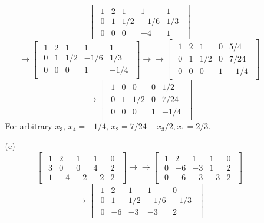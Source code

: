 \documentclass[12pt]{article}
\begin{document}
\begin{itemize}
\begin{itemize}
$$\begin{bmatrix}
\begin{array}{cccc|c}
1 & 2 & 1 & 1 & 1 \\
0 & 1 & 1/2 & -1/6 & 1/3 \\
0 & 0 & 0 & -4 & 1
\end{array}
\end{bmatrix}$$
$$\rightarrow \begin{bmatrix}
\begin{array}{cccc|c}
1 & 2 & 1 & 1 & 1 \\
0 & 1 & 1/2 & -1/6 & 1/3 \\
0 & 0 & 0 & 1 & -1/4
\end{array}
\end{bmatrix}\rightarrow\rightarrow \begin{bmatrix}
\begin{array}{cccc|c}
1 & 2 & 1 & 0 & 5/4 \\
0 & 1 & 1/2 & 0 & 7/24 \\
0 & 0 & 0 & 1 & -1/4
\end{array}
\end{bmatrix}$$
$$\rightarrow \begin{bmatrix}
\begin{array}{cccc|c}
1 & 0 & 0 & 0 & 1/2 \\
0 & 1 & 1/2 & 0 & 7/24 \\
0 & 0 & 0 & 1 & -1/4
\end{array}
\end{bmatrix}$$
For arbitrary $x_3$, $x_4 = -1/4$, $x_2 = 7/24 - x_3/2, x_1 = 2/3$.
\item[(c)]
$$\begin{bmatrix}
\begin{array}{cccc|c}
1 & 2 & 1 & 1 & 0 \\
3 & 0 & 0 & 4 & 2 \\
1 & -4 & -2 & -2 & 2
\end{array}
\end{bmatrix} \rightarrow\rightarrow \begin{bmatrix}
\begin{array}{cccc|c}
1 & 2 & 1 & 1 & 0 \\
0 & -6 & -3 & 1 & 2 \\
0 & -6 & -3 & -3 & 2
\end{array}
\end{bmatrix}$$
$$ \rightarrow \begin{bmatrix}
\begin{array}{cccc|c}
1 & 2 & 1 & 1 & 0 \\
0 & 1 & 1/2 & -1/6 & -1/3 \\
0 & -6 & -3 & -3 & 2
\end{array}

\end{bmatrix}$$
\end{itemize}
\end{itemize}
\end{document}
